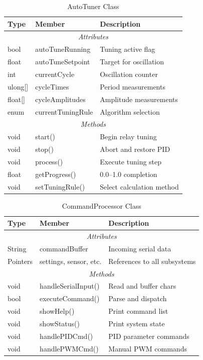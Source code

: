 \begin{table}[H]
\centering
\caption{AutoTuner Class}
\label{tab:auto-tuner}
\begin{tabular}{|l|l|p{6cm}|}
\hline
\textbf{Type} & \textbf{Member} & \textbf{Description} \\
\hline
\multicolumn{3}{|c|}{\textit{Attributes}} \\
\hline
bool & autoTuneRunning & Tuning active flag \\
float & autoTuneSetpoint & Target for oscillation \\
int & currentCycle & Oscillation counter \\
ulong[] & cycleTimes & Period measurements \\
float[] & cycleAmplitudes & Amplitude measurements \\
enum & currentTuningRule & Algorithm selection \\
\hline
\multicolumn{3}{|c|}{\textit{Methods}} \\
\hline
void & start() & Begin relay tuning \\
void & stop() & Abort and restore PID \\
void & process() & Execute tuning step \\
float & getProgress() & 0.0--1.0 completion \\
void & setTuningRule() & Select calculation method \\
\hline
\end{tabular}
\end{table}

\begin{table}[H]
\centering
\caption{CommandProcessor Class}
\label{tab:command-processor}
\begin{tabular}{|l|l|p{6cm}|}
\hline
\textbf{Type} & \textbf{Member} & \textbf{Description} \\
\hline
\multicolumn{3}{|c|}{\textit{Attributes}} \\
\hline
String & commandBuffer & Incoming serial data \\
Pointers & settings, sensor, etc. & References to all subsystems \\
\hline
\multicolumn{3}{|c|}{\textit{Methods}} \\
\hline
void & handleSerialInput() & Read and buffer chars \\
bool & executeCommand() & Parse and dispatch \\
void & showHelp() & Print command list \\
void & showStatus() & Print system state \\
void & handlePIDCmd() & PID parameter commands \\
void & handlePWMCmd() & Manual PWM commands \\
\hline
\end{tabular}
\end{table}

